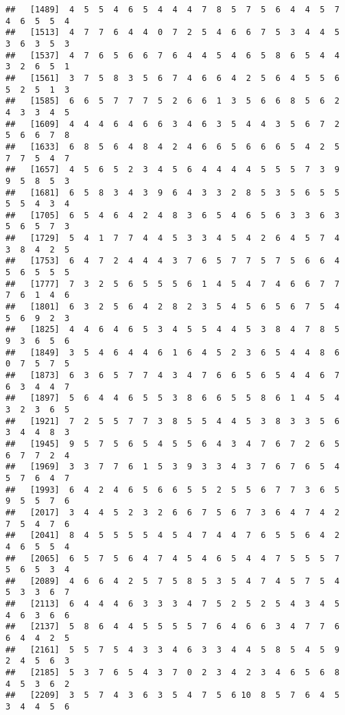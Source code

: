 \documentclass[
]{book}
\begin{document}
\begin{verbatim}
##   [1489]  4  5  5  4  6  5  4  4  4  7  8  5  7  5  6  4  4  5  7  4  6  5  5  4
##   [1513]  4  7  7  6  4  4  0  7  2  5  4  6  6  7  5  3  4  4  5  3  6  3  5  3
##   [1537]  4  7  6  5  6  6  7  6  4  4  5  4  6  5  8  6  5  4  4  3  2  6  5  1
##   [1561]  3  7  5  8  3  5  6  7  4  6  6  4  2  5  6  4  5  5  6  5  2  5  1  3
##   [1585]  6  6  5  7  7  7  5  2  6  6  1  3  5  6  6  8  5  6  2  4  3  3  4  5
##   [1609]  4  4  4  6  4  6  6  3  4  6  3  5  4  4  3  5  6  7  2  5  6  6  7  8
##   [1633]  6  8  5  6  4  8  4  2  4  6  6  5  6  6  6  5  4  2  5  7  7  5  4  7
##   [1657]  4  5  6  5  2  3  4  5  6  4  4  4  4  5  5  5  7  3  9  9  5  8  5  3
##   [1681]  6  5  8  3  4  3  9  6  4  3  3  2  8  5  3  5  6  5  5  5  5  4  3  4
##   [1705]  6  5  4  6  4  2  4  8  3  6  5  4  6  5  6  3  3  6  3  5  6  5  7  3
##   [1729]  5  4  1  7  7  4  4  5  3  3  4  5  4  2  6  4  5  7  4  3  8  4  2  5
##   [1753]  6  4  7  2  4  4  4  3  7  6  5  7  7  5  7  5  6  6  4  5  6  5  5  5
##   [1777]  7  3  2  5  6  5  5  5  6  1  4  5  4  7  4  6  6  7  7  7  6  1  4  6
##   [1801]  6  3  2  5  6  4  2  8  2  3  5  4  5  6  5  6  7  5  4  5  6  9  2  3
##   [1825]  4  4  6  4  6  5  3  4  5  5  4  4  5  3  8  4  7  8  5  9  3  6  5  6
##   [1849]  3  5  4  6  4  4  6  1  6  4  5  2  3  6  5  4  4  8  6  0  7  5  7  5
##   [1873]  6  3  6  5  7  7  4  3  4  7  6  6  5  6  5  4  4  6  7  6  3  4  4  7
##   [1897]  5  6  4  4  6  5  5  3  8  6  6  5  5  8  6  1  4  5  4  3  2  3  6  5
##   [1921]  7  2  5  5  7  7  3  8  5  5  4  4  5  3  8  3  3  5  6  3  4  4  8  3
##   [1945]  9  5  7  5  6  5  4  5  5  6  4  3  4  7  6  7  2  6  5  6  7  7  2  4
##   [1969]  3  3  7  7  6  1  5  3  9  3  3  4  3  7  6  7  6  5  4  5  7  6  4  7
##   [1993]  6  4  2  4  6  5  6  6  5  5  2  5  5  6  7  7  3  6  5  9  5  5  7  6
##   [2017]  3  4  4  5  2  3  2  6  6  7  5  6  7  3  6  4  7  4  2  7  5  4  7  6
##   [2041]  8  4  5  5  5  5  4  5  4  7  4  4  7  6  5  5  6  4  2  4  6  5  5  4
##   [2065]  6  5  7  5  6  4  7  4  5  4  6  5  4  4  7  5  5  5  7  5  6  5  3  4
##   [2089]  4  6  6  4  2  5  7  5  8  5  3  5  4  7  4  5  7  5  4  5  3  3  6  7
##   [2113]  6  4  4  4  6  3  3  3  4  7  5  2  5  2  5  4  3  4  5  4  6  3  6  6
##   [2137]  5  8  6  4  4  5  5  5  5  7  6  4  6  6  3  4  7  7  6  6  4  4  2  5
##   [2161]  5  5  7  5  4  3  3  4  6  3  3  4  4  5  8  5  4  5  9  2  4  5  6  3
##   [2185]  5  3  7  6  5  4  3  7  0  2  3  4  2  3  4  6  5  6  8  4  5  3  6  2
##   [2209]  3  5  7  4  3  6  3  5  4  7  5  6 10  8  5  7  6  4  5  3  4  4  5  6

\end{verbatim}
\end{document}
